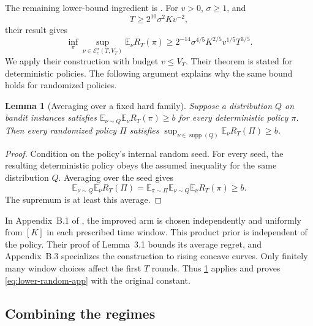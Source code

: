 \documentclass[11pt]{article}
\newtheorem{lemma}[lemma]{Lemma}
\theoremstyle{remark}
\newcommand{\E}{\mathbb E}
\newcommand{\cE}{\mathcal E}
\begin{document}
The remaining lower-bound ingredient is
\citet[Theorem~3.3]{migali2025tightening}.  For $v>0$, $\sigma\ge1$,
and
\begin{equation}\label{eq:lower-range-app}
T\ge2^{10}\sigma^2Kv^{-2},
\end{equation}
their result gives
\begin{equation}\label{eq:lower-random-app}
\inf_\pi\sup_{\nu\in\cE_c^\sigma(T,V_T)}
\E_\nu R_T(\pi)
\ge2^{-14}\sigma^{4/5}K^{2/5}v^{1/5}T^{3/5}.
\end{equation}
We apply their construction with budget $v\le V_T$.
Their theorem is stated for deterministic policies.  The following
argument explains why the same bound holds for randomized policies.

\begin{samepage}
\begin{lemma}[Averaging over a fixed hard family]\label{lem:yao-app}
Suppose a distribution $Q$ on bandit instances satisfies
$\E_{\nu\sim Q}\E_\nu R_T(\pi)\ge b$ for every deterministic policy
$\pi$.  Then every randomized policy $\Pi$ satisfies
$\sup_{\nu\in\operatorname{supp}(Q)}\E_\nu R_T(\Pi)\ge b$.
\end{lemma}
\end{samepage}

\begin{proof}
Condition on the policy's internal random seed.  For every seed, the
resulting deterministic policy obeys the assumed inequality for the
same distribution $Q$.  Averaging over the seed gives
\[
\E_{\nu\sim Q}\E_\nu R_T(\Pi)
=\E_{\pi\sim\Pi}\E_{\nu\sim Q}\E_\nu R_T(\pi)\ge b.
\]
The supremum is at least this average.
\end{proof}

In Appendix~B.1 of \citet{migali2025tightening}, the improved arm is
chosen independently and uniformly from $[K]$ in each prescribed time
window.  This product prior is independent of the policy.  Their proof
of Lemma~3.1 bounds its average regret, and Appendix~B.3 specializes the
construction to rising concave curves.  Only finitely many window
choices affect the first $T$ rounds.  Thus \cref{lem:yao-app} applies
and proves \eqref{eq:lower-random-app} with the original constant.

\subsection{Combining the regimes}
\end{document}
